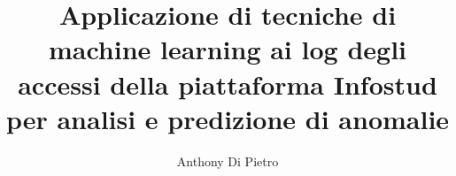 \documentclass[italian, noexaminfo]{sapthesis}  %
\title{Applicazione di tecniche di machine learning ai log degli 
        accessi della piattaforma Infostud per analisi e predizione 
        di anomalie}
\author{Anthony Di Pietro}
\begin{document}
    
    \frontmatter

    \maketitle

    \tableofcontents
    \mainmatter
    
    

    \backmatter

    \cleardoublepage

\end{document}
